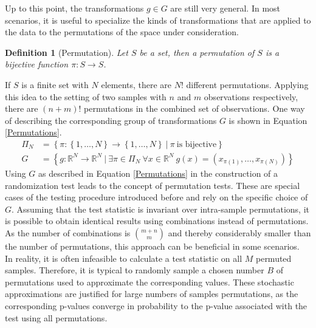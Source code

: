 \documentclass[12pt, a4paper]{article}
\theoremstyle{MAstyle} \newtheorem{assumption}{Assumption}[section]
\theoremstyle{MAstyle} \newtheorem{definition}{Definition}[section]
\theoremstyle{MAstyle} \newtheorem{theorem}{Theorem}[section]
\begin{document}
			Up to this point, the transformations $g \in G$ are still very general. In most scenarios, it is useful to specialize the kinds of transformations that are applied to the data to the permutations of the space under consideration.
			\begin{definition}[Permutation]\label{permutation}
				Let $S$ be a set, then a permutation of $S$ is a bijective function $\pi: S \rightarrow S$.
			\end{definition}
		
			\newpage
			If $S$ is a finite set with $N$ elements, there are $N!$ different permutations. Applying this idea to the setting of two samples with $n$ and $m$ observations respectively, there are $(n+m)!$ permutations in the combined set of observations. One way of describing the corresponding group of transformations $G$ is shown in Equation \ref{Permutations}.
			\begin{equation}\label{Permutations}
				\begin{split}
					\Pi_N &= \left\{\pi: \left\{1, \dots, N \right\} \rightarrow \left\{1, \dots, N \right\} \ \vert \ \pi \ \text{is bijective} \right\} \\
					G &= \left\{g:\mathbb{R}^N \rightarrow \mathbb{R}^N \ \vert \ \exists \pi \in \Pi_N \ \forall x \in \mathbb{R}^N \ g(x) = \left(x_{\pi(1)}, \dots, x_{\pi(N)}\right) \right\}
				\end{split}
			\end{equation}
			Using $G$ as described in Equation \ref{Permutations} in the construction of a randomization test leads to the concept of permutation tests. These are special cases of the testing procedure introduced before and rely on the specific choice of $G$. Assuming that the test statistic is invariant over intra-sample permutations, it is possible to obtain identical results using combinations instead of permutations. As the number of combinations is $\binom{m+n}{m}$ and thereby considerably smaller than the number of permutations, this approach can be beneficial in some scenarios.\\

			In reality, it is often infeasible to calculate a test statistic on all $M$ permuted samples. Therefore, it is typical to randomly sample a chosen number $B$ of permutations used to approximate the corresponding values. These stochastic approximations are justified for large numbers of samples permutations, as the corresponding p-values converge in probability to the p-value associated with the test using all permutations. 
			
\end{document}
